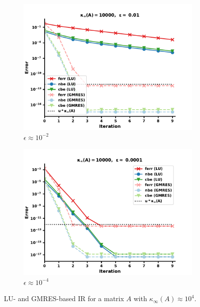 \begin{figure}
\centering
\begin{subfigure}{.5\textwidth}
  \centering
  \includegraphics[width=\linewidth]{chapters/5_experiments/figures/LR512e1_0.pdf}
  \caption{$\epsilon \approx 10^{-2}$}
  \label{fig:lrir2_1}
\end{subfigure}%
\begin{subfigure}{.5\textwidth}
  \centering
  \includegraphics[width=\linewidth]{chapters/5_experiments/figures/LR512e1_1.pdf}
  \caption{$\epsilon \approx 10^{-4}$}
  \label{fig:lrir2_2}
\end{subfigure}
\caption[Low-Rank IR 2]{LU- and GMRES-based IR for a matrix $A$ with $\kappa_\infty(A) \approx 10^4$.}
\label{fig:lrir2}
\end{figure}

